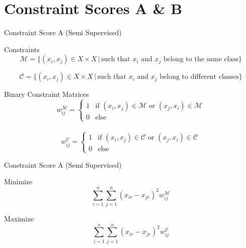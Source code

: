 \documentclass{beamer}
\begin{document}
\section{Constraint Scores A \& B}
\begin{frame}{Constraint Score A (Semi Supervised)}
    \begin{block}{Constraints}
        \[
\mathcal{M} = \{(x_i, x_j) \in X \times X \,|\, \text{such that } x_i \text{ and } x_j \text{ belong to the same class}\}
\]

\[
\mathcal{C} = \{(x_i, x_j) \in X \times X \,|\, \text{such that } x_i \text{ and } x_j \text{ belong to different classes}\}
\]
    \end{block}

\begin{block}{Binary Constraint Matrices}
    \[
w_{ij}^{\mathcal{M}} =
\begin{cases}
  1 & \text{if } (x_i, x_j) \in \mathcal{M} \text{ or } (x_j, x_i) \in \mathcal{M}\\
  0 & \text{else}
\end{cases}
\]
\\

\[
w_{ij}^{\mathcal{C}} =
\begin{cases}
  1 & \text{if } (x_i, x_j) \in \mathcal{C} \text{ or } (x_j, x_i) \in \mathcal{C} \\
  0 & \text{else}
\end{cases}
\]

\end{block}

\end{frame}

\begin{frame}{Constraint Score A (Semi Supervised)}
    \begin{block}{Minimize}
        \[
\sum_{i=1}^{n} \sum_{j=1}^n (x_{ir} - x_{jr})^2 w_{ij}^{\mathcal{M}}
\]
    \end{block}

    \begin{block}{Maximize}
        \[
\sum_{i=1}^{n} \sum_{j=1}^n (x_{ir} - x_{jr})^2 w_{ij}^{\mathcal{C}}
\]

    \end{block}
\end{frame}
\end{document}
